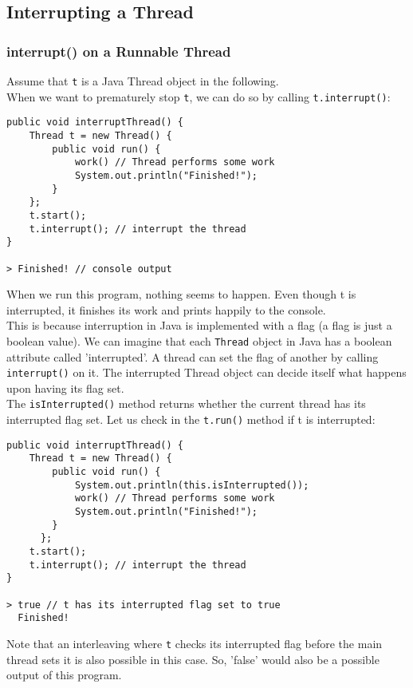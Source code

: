 \documentclass[main.tex]{subfiles}
\begin{document}
\subsection{Interrupting a Thread}
\subsubsection{interrupt() on a Runnable Thread}
Assume that \texttt{t} is a Java Thread object in the following.\\
When we want to prematurely stop \texttt{t}, we can do so by calling \texttt{t.interrupt()}:
\begin{verbatim}
public void interruptThread() {
    Thread t = new Thread() {
        public void run() {
            work() // Thread performs some work
            System.out.println("Finished!");
        }
    };
    t.start();
    t.interrupt(); // interrupt the thread
}

> Finished! // console output
\end{verbatim}
When we run this program, nothing seems to happen. Even though t is interrupted, it finishes its work and prints happily to the console.\\
This is because interruption in Java is implemented with a flag (a flag is just a boolean value). We can imagine that each \texttt{Thread} object in Java has a boolean attribute called 'interrupted'. A thread can set the flag of another by calling \texttt{interrupt()} on it. The interrupted Thread object can decide itself what happens upon having its flag set.\\
The \texttt{isInterrupted()} method returns whether the current thread has its interrupted flag set. Let us check in the \texttt{t.run()} method if t is interrupted:
\begin{verbatim}
public void interruptThread() {
    Thread t = new Thread() {
        public void run() {
            System.out.println(this.isInterrupted());
            work() // Thread performs some work
            System.out.println("Finished!");
        }
      };
    t.start();
    t.interrupt(); // interrupt the thread
}

> true // t has its interrupted flag set to true
  Finished!
\end{verbatim}
Note that an interleaving where \texttt{t} checks its interrupted flag before the main thread sets it is also possible in this case. So, 'false' would also be a possible output of this program.
\end{document}

